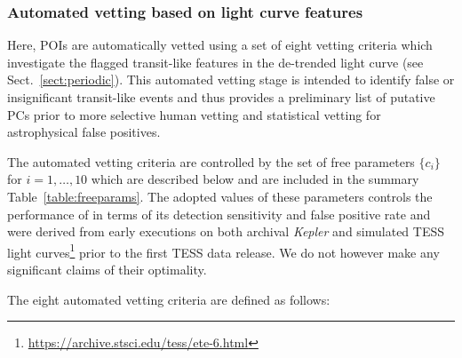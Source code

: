 \subsubsection{Automated vetting based on light curve features} \label{sect:autovetting}
Here, POIs are automatically vetted using a set of eight vetting criteria which investigate
the flagged transit-like features in the de-trended light curve (see Sect.~\ref{sect:periodic}).
This automated vetting stage is intended to identify false or insignificant transit-like events
and thus provides a preliminary list of putative PCs prior to more selective human vetting
and statistical vetting for astrophysical false positives.

The automated vetting criteria are controlled by the set of free parameters
$\{c_i\}$ for $i=1,\dots,10$ which are described below and are included in the
summary Table~\ref{table:freeparams}.
The adopted values of these parameters controls the performance of \pipeline{} in terms of its
detection sensitivity and false positive rate and were derived
from early \pipeline{} executions on both archival \emph{Kepler} and simulated TESS light
curves\footnote{\url{https://archive.stsci.edu/tess/ete-6.html}} prior to the first TESS data
release. We do not however make any significant claims of their optimality.

The eight automated vetting criteria are defined as follows:

